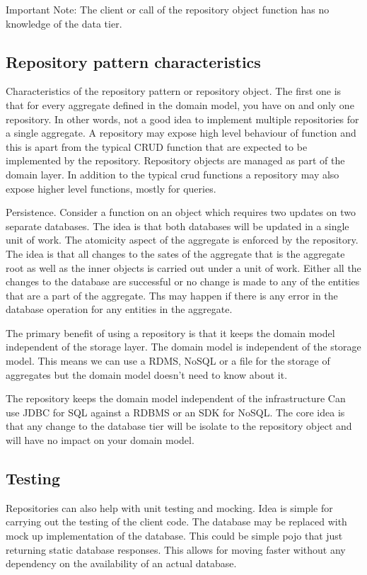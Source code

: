 \begin{note}
    Important Note: The client or call of the repository object function has no knowledge of the data tier.
\end{note}

\subsection{Repository pattern characteristics}
Characteristics of the repository pattern or repository object.
The first one is that for every aggregate defined in the domain model, you have on and only one repository.
In other words, not a good idea to implement multiple repositories for a single aggregate.
A repository may expose high level behaviour of function and this is apart from the typical CRUD function that are expected to be implemented by the repository.
Repository objects are managed as part of the domain layer.
In addition to the typical crud functions a repository may also expose higher level functions, mostly for queries.

Persistence.
Consider a function on an object which requires two updates on two separate databases.
The idea is that both databases will be updated in a single unit of work.
The atomicity aspect of the aggregate is enforced by the repository.
The idea is that all changes to the sates of the aggregate that is the aggregate root as well as the inner objects is carried out under a unit of work.
Either all the changes to the database are successful or no change is made to any of the entities that are a part of the aggregate.
Ths may happen if there is any error in the database operation for any entities in the aggregate.

The primary benefit of using a repository is that it keeps the domain model independent of the storage layer.
The domain model is independent of the storage model.
This means we can use a RDMS, NoSQL or a file for the storage of aggregates but the domain model doesn't need to know about it.
\begin{note}
    The repository keeps the domain model independent of the infrastructure
    Can use JDBC for SQL against a RDBMS or an SDK for NoSQL.
    The core idea is that any change to the database tier will be isolate to the repository object and will have no impact on your domain model.
\end{note}

\subsection{Testing}
Repositories can also help with unit testing and mocking.
Idea is simple for carrying out the testing of the client code.
The database may be replaced with mock up implementation of the database.
This could be simple pojo that just returning static database responses.
This allows for moving faster without any dependency on the availability of an actual database.

